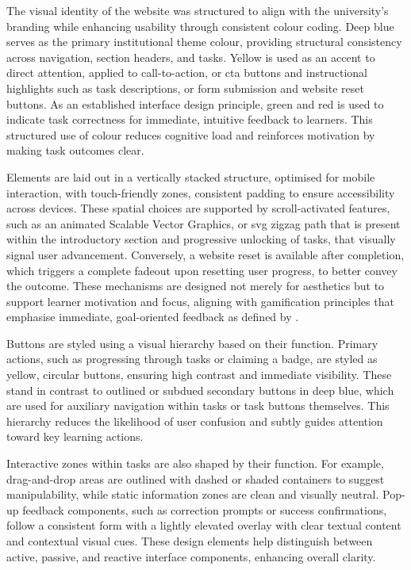 The visual identity of the website was structured to align with the university's branding while enhancing usability through consistent colour coding. 
Deep blue serves as the primary institutional theme colour, providing structural consistency across navigation, section headers, and tasks. 
Yellow is used as an accent to direct attention, applied to call-to-action, or \acrshort{cta} buttons and instructional highlights such as task descriptions, or form submission and website reset buttons. 
As an established interface design principle, green and red is used to indicate task correctness for immediate, intuitive feedback to learners. 
This structured use of colour reduces cognitive load and reinforces motivation by making task outcomes clear.

Elements are laid out in a vertically stacked structure, optimised for mobile interaction, with touch-friendly zones, consistent padding to ensure accessibility across devices. 
These spatial choices are supported by scroll-activated features, such as an animated Scalable Vector Graphics, or \acrshort{svg} zigzag path that is present within the introductory section and progressive unlocking of tasks, that visually signal user advancement. 
Conversely, a website reset is available after completion, which triggers a complete fadeout upon resetting user progress, to better convey the outcome. 
These mechanisms are designed not merely for aesthetics but to support learner motivation and focus, aligning with gamification principles that emphasise immediate, goal-oriented feedback as defined by \cite{redefinition}.

Buttons are styled using a visual hierarchy based on their function. 
Primary actions, such as progressing through tasks or claiming a badge, are styled as yellow, circular buttons, ensuring high contrast and immediate visibility. 
These stand in contrast to outlined or subdued secondary buttons in deep blue, which are used for auxiliary navigation within tasks or task buttons themselves. 
This hierarchy reduces the likelihood of user confusion and subtly guides attention toward key learning actions.

Interactive zones within tasks are also shaped by their function. 
For example, drag-and-drop areas are outlined with dashed or shaded containers to suggest manipulability, while static information zones are clean and visually neutral. 
Pop-up feedback components, such as correction prompts or success confirmations, follow a consistent form with a lightly elevated overlay with clear textual content and contextual visual cues. 
These design elements help distinguish between active, passive, and reactive interface components, enhancing overall clarity.

